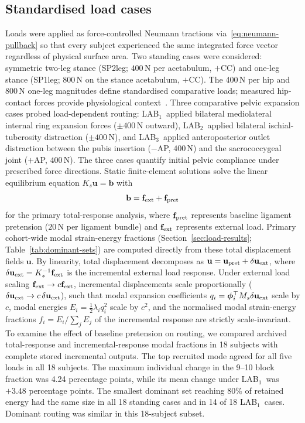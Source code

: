 \documentclass[pdflatex,sn-basic]{sn-jnl}
\newcommand{\LABone}{LAB$_1$}
\newcommand{\LABtwo}{LAB$_2$}
\newcommand{\LABthree}{LAB$_3$}
\begin{document}
\subsection{Standardised load cases}
\label{sec:loading}

Loads were applied as force-controlled Neumann tractions via~\eqref{eq:neumann-pullback} so that every subject experienced the same integrated force vector regardless of physical surface area.
Two standing cases were considered: symmetric two-leg stance (SP2leg; $400$\,N per acetabulum, $+$CC) and one-leg stance (SP1leg; $800$\,N on the stance acetabulum, $+$CC).
The 400\,N per hip and 800\,N one-leg magnitudes define standardised comparative loads; measured hip-contact forces provide physiological context~\citep{Bergmann2001JBiomech,Kutzner2016PLOS}.
Three comparative pelvic expansion cases probed load-dependent routing: \LABone\ applied bilateral mediolateral internal ring expansion forces ($\pm 400$\,N outward), \LABtwo\ applied bilateral ischial-tuberosity distraction ($\pm 400$\,N), and \LABthree\ applied anteroposterior outlet distraction between the pubis insertion ($-$AP, $400$\,N) and the sacrococcygeal joint ($+$AP, $400$\,N).
The three cases quantify initial pelvic compliance under prescribed force directions.
Static finite-element solutions solve the linear equilibrium equation $K_s \mathbf u = \mathbf b$ with
\begin{equation}
\mathbf b = \mathbf f_{\rm ext} + \mathbf f_{\rm pret}
\label{eq:total-load-vector}
\end{equation}
for the primary total-response analysis, where $\mathbf f_{\rm pret}$ represents baseline ligament pretension ($20$\,N per ligament bundle) and $\mathbf f_{\rm ext}$ represents external load.
Primary cohort-wide modal strain-energy fractions (Section~\ref{sec:load-results}; Table~\ref{tab:dominant-sets}) are computed directly from these total displacement fields $\mathbf u$.
By linearity, total displacement decomposes as $\mathbf u = \mathbf u_{\rm pret} + \delta\mathbf u_{\rm ext}$, where $\delta\mathbf u_{\rm ext} = K_s^{-1}\mathbf f_{\rm ext}$ is the incremental external load response.
Under external load scaling $\mathbf f_{\rm ext} \to c\mathbf f_{\rm ext}$, incremental displacements scale proportionally ($\delta\mathbf u_{\rm ext} \to c\,\delta\mathbf u_{\rm ext}$), such that modal expansion coefficients $q_i = \boldsymbol\phi_i^\top M_s \delta\mathbf u_{\rm ext}$ scale by $c$, modal energies $E_i = \frac{1}{2}\lambda_i q_i^2$ scale by $c^2$, and the normalised modal strain-energy fractions $f_i = E_i / \sum_j E_j$ of the incremental response are strictly scale-invariant.
To examine the effect of baseline pretension on routing, we compared archived total-response and incremental-response modal fractions in 18 subjects with complete stored incremental outputs. The top recruited mode agreed for all five loads in all 18 subjects. The maximum individual change in the 9--10 block fraction was 4.24 percentage points, while its mean change under \LABone\ was $+3.48$ percentage points. The smallest dominant set reaching 80\% of retained energy had the same size in all 18 standing cases and in 14 of 18 \LABone\ cases. Dominant routing was similar in this 18-subject subset.
\end{document}
